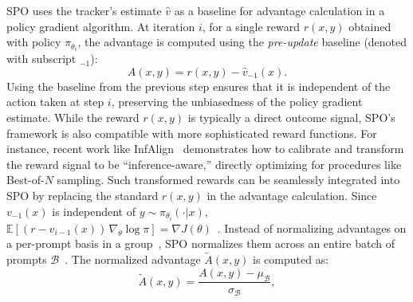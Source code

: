 SPO uses the tracker's estimate $\hat{v}$ as a baseline for advantage calculation in a policy gradient algorithm. At iteration $i$, for a single reward $r(x, y)$ obtained with policy $\pi_{\theta_i}$, the advantage is computed using the \emph{pre-update} baseline (denoted with subscript $_{-1}$):
\begin{equation}
    A(x, y) = r(x, y) - \hat{v}_{-1}(x).
\end{equation}
Using the baseline from the previous step ensures that it is independent of the action taken at step $i$, preserving the unbiasedness of the policy gradient estimate. While the reward $r(x, y)$ is typically a direct outcome signal, SPO's framework is also compatible with more sophisticated reward functions. For instance, recent work like InfAlign~\cite{balashankar2024infalign} demonstrates how to calibrate and transform the reward signal to be ``inference-aware,'' directly optimizing for procedures like Best-of-$N$ sampling. Such transformed rewards can be seamlessly integrated into SPO by replacing the standard $r(x, y)$ in the advantage calculation. Since $v_{-1}(x)$ is independent of $y \sim \pi_{\theta_i}(\cdot| x)$, $\mathbb{E}\!\left[(r - v_{i-1}(x))\,\nabla_\theta \log \pi\right] = \nabla J(\theta)$~\cite{REINFORCE}. Instead of normalizing advantages on a per-prompt basis in a group~\cite{GRPO,R1}, SPO normalizes them across an entire batch of prompts $\mathcal{B}$~\cite{RFplusplus,PPO,andrychowicz2020matters,gem}.  The normalized advantage $\tilde{A}(x, y)$ is computed as:
\begin{equation}
    \tilde{A}(x, y) = \frac{A(x, y) - \mu_{\mathcal{B}}}{\sigma_{\mathcal{B}}},
\end{equation}
